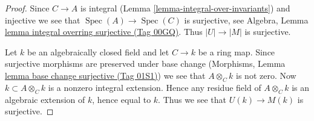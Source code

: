 \documentclass{amsart}
\theoremstyle{plain}
\theoremstyle{definition}
\theoremstyle{remark}
\numberwithin{equation}{subsection}
\def\Spec{\mathop{\mathrm{Spec}}}
\begin{document}
\begin{proof}
Since $C \to A$ is integral (Lemma \ref{lemma-integral-over-invariants})
and injective we see that $\Spec(A) \to \Spec(C)$ is surjective, see
Algebra, Lemma \href{https://stacks.math.columbia.edu/tag/00GQ}{lemma integral overring surjective (Tag 00GQ)}.
Thus $|U| \to |M|$ is surjective.

\medskip\noindent
Let $k$ be an algebraically closed field and let $C \to k$ be a ring map.
Since surjective morphisms are preserved under base change
(Morphisms, Lemma \href{https://stacks.math.columbia.edu/tag/01S1}{lemma base change surjective (Tag 01S1)})
we see that $A \otimes_C k$ is not zero. Now $k \subset A \otimes_C k$ is a
nonzero integral extension. Hence any residue field of $A \otimes_C k$
is an algebraic extension of $k$, hence equal to $k$. Thus we see that
$U(k) \to M(k)$ is surjective.


\end{proof}
\end{document}
